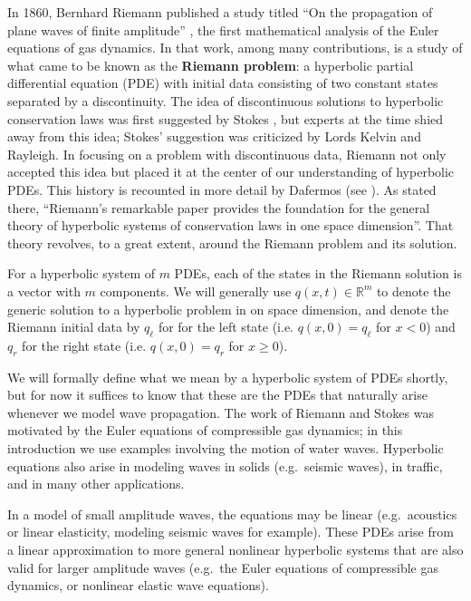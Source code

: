 \documentclass{SIAMbook2016}
\begin{document}
In 1860, Bernhard Riemann published a study titled ``On the propagation
of plane waves of finite amplitude'' \cite{riemann1860fortpflanzung},
the first mathematical analysis of the Euler equations of gas dynamics.
In that work, among many contributions, is a study of what came to be
known as the \textbf{Riemann problem}: a hyperbolic partial differential
equation (PDE) with initial data consisting of two constant states
separated by a discontinuity. The idea of discontinuous solutions to
hyperbolic conservation laws was first suggested by Stokes
\cite{stokes1848liv}, but experts at the time shied away from this idea;
Stokes' suggestion was criticized by Lords Kelvin and Rayleigh. In
focusing on a problem with discontinuous data, Riemann not only accepted
this idea but placed it at the center of our understanding of hyperbolic
PDEs. This history is recounted in more detail by Dafermos (see
\cite{dafermos2010hyperbolic}). As stated there, ``Riemann's remarkable
paper provides the foundation for the general theory of hyperbolic
systems of conservation laws in one space dimension''. That theory
revolves, to a great extent, around the Riemann problem and its
solution.

For a hyperbolic system of \(m\) PDEs, each of the states in the Riemann
solution is a vector with \(m\) components. We will generally use
\(q(x,t)\in\mathbb{R}^m\) to denote the generic solution to a hyperbolic
problem in on space dimension, and denote the Riemann initial data by
\(q_\ell\) for for the left state (i.e. \(q(x,0) = q_\ell\) for \(x<0\))
and \(q_r\) for the right state (i.e. \(q(x,0) = q_r\) for
\(x \geq 0\)).

We will formally define what we mean by a hyperbolic system of PDEs
shortly, but for now it suffices to know that these are the PDEs that
naturally arise whenever we model wave propagation. The work of Riemann
and Stokes was motivated by the Euler equations of compressible gas
dynamics; in this introduction we use examples involving the motion of
water waves. Hyperbolic equations also arise in modeling waves in solids
(e.g.~seismic waves), in traffic, and in many other applications.

In a model of small amplitude waves, the equations may be linear
(e.g.~acoustics or linear elasticity, modeling seismic waves for
example). These PDEs arise from a linear approximation to more general
nonlinear hyperbolic systems that are also valid for larger amplitude
waves (e.g.~the Euler equations of compressible gas dynamics, or
nonlinear elastic wave equations).
\end{document}
